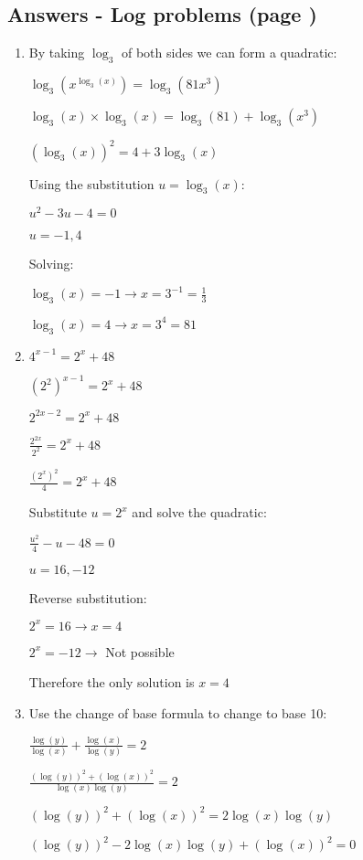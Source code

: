 \documentclass[../main.tex]{subfiles}
\begin{document}
\subsection*{Answers - Log problems (page \pageref{Log problems})}
\label{Log problems answers}
\begin{enumerate}[itemsep=0.4cm]
    \item     
    By taking $\log_3$ of both sides we can form a quadratic:

    \(\log_3(x^{\log_3(x)})=\log_3(81x^3)\)

    \(\log_3(x)\times \log_3(x)=\log_3(81)+\log_3(x^3)\)

    \((\log_3(x))^2=4+3\log_3(x)\)

    Using the substitution $u=\log_3(x)$:

    \(u^2-3u-4=0\)

    \(u=-1,4\)

    Solving:

    \(\log_3(x)=-1 \rightarrow x=3^{-1} = \frac{1}{3}\)

    \(\log_3(x)=4 \rightarrow x=3^4 = 81\)

    \item 
    \(4^{x-1}=2^x +48\)

    \((2^2)^{x-1}=2^x +48\)

    \(2^{2x-2}=2^x +48\)

    \(\frac{2^{2x}}{2^2}=2^x +48\)

    \(\frac{(2^x)^2}{4}=2^x +48\)

    Substitute $u=2^x$ and solve the quadratic:

    \(\frac{u^2}{4}-u-48=0\)

    \(u=16, -12\)

    Reverse substitution:

    \(2^x=16 \rightarrow x=4\)

    \(2^x = -12 \rightarrow\) Not possible

    Therefore the only solution is $x=4$

    \item Use the change of base formula to change to base 10:

    \(\frac{\log(y)}{\log(x)}+\frac{\log(x)}{\log(y)}=2\)

    \(\frac{(\log(y))^2 + (\log(x))^2}{\log(x)\log(y)}=2\)

    \((\log(y))^2 + (\log(x))^2=2\log(x)\log(y)\)

    \((\log(y))^2 -2\log(x)\log(y) + (\log(x))^2=0\)


\end{enumerate}
\end{document}
